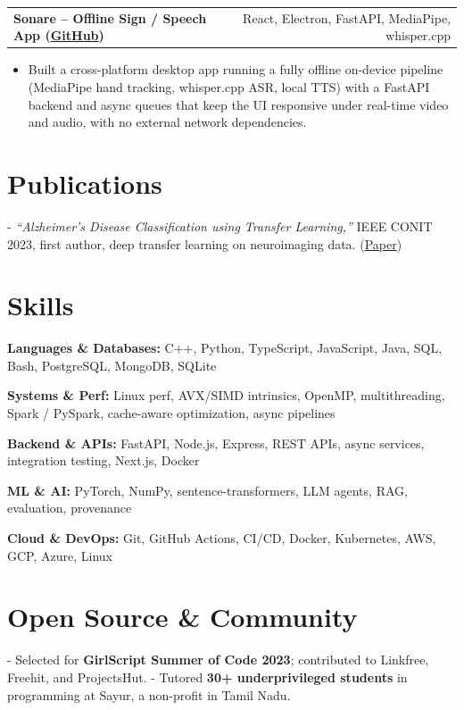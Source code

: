 \documentclass[letterpaper,11pt]{article}
\makeatletter
\newcommand{\projItem}[2]{%
  \vspace{2pt}
  \begin{tabular*}{\textwidth}{@{}l@{\extracolsep{\fill}}r@{}}
    \textbf{#1} & #2 \\
  \end{tabular*}\par\vspace{-3pt}
}
\newcommand{\skillLine}[2]{\textbf{#1:} #2\par\vspace{1.5pt}}
\newcommand{\inlineBlock}[1]{{\setlength{\leftskip}{0.18in}\small #1\par}}
\makeatother
\begin{document}
\projItem{Sonare -- Offline Sign / Speech App {\normalfont\small(\href{https://github.com/Deva-1903/Qualcomm-Sep25-Team-Sonare}{GitHub})}}{React, Electron, FastAPI, MediaPipe, whisper.cpp}
\begin{itemize}
  \item Built a cross-platform desktop app running a fully offline on-device pipeline (MediaPipe hand tracking, whisper.cpp ASR, local TTS) with a FastAPI backend and async queues that keep the UI responsive under real-time video and audio, with no external network dependencies.
\end{itemize}

\section{Publications}
\vspace{2pt}
\inlineBlock{- \textit{``Alzheimer's Disease Classification using Transfer Learning,''} IEEE CONIT 2023, first author, deep transfer learning on neuroimaging data. {\normalfont\small(\href{https://ieeexplore.ieee.org/document/10205760}{Paper})}}

\section{Skills}
\skillLine{Languages \& Databases}{C++, Python, TypeScript, JavaScript, Java, SQL, Bash, PostgreSQL, MongoDB, SQLite}
\skillLine{Systems \& Perf}{Linux perf, AVX/SIMD intrinsics, OpenMP, multithreading, Spark / PySpark, cache-aware optimization, async pipelines}
\skillLine{Backend \& APIs}{FastAPI, Node.js, Express, REST APIs, async services, integration testing, Next.js, Docker}
\skillLine{ML \& AI}{PyTorch, NumPy, sentence-transformers, LLM agents, RAG, evaluation, provenance}
\skillLine{Cloud \& DevOps}{Git, GitHub Actions, CI/CD, Docker, Kubernetes, AWS, GCP, Azure, Linux}

\section{Open Source \& Community}
\inlineBlock{- Selected for \textbf{GirlScript Summer of Code 2023}; contributed to Linkfree, Freehit, and ProjectsHut. - Tutored \textbf{30+ underprivileged students} in programming at Sayur, a non-profit in Tamil Nadu.}
\end{document}
